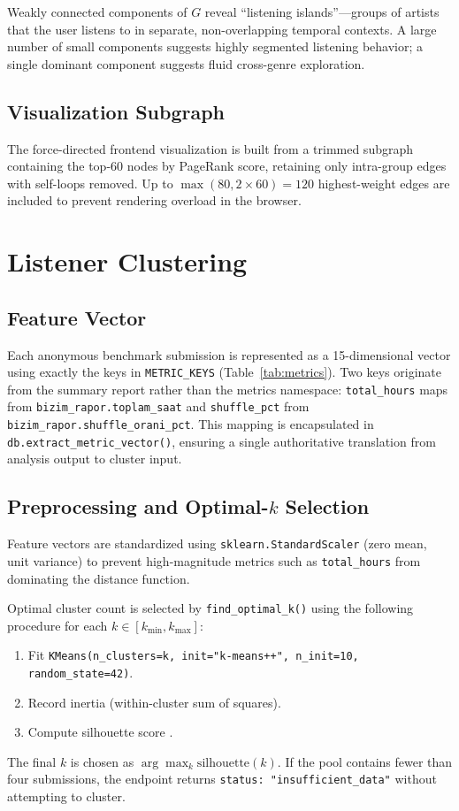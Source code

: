 \documentclass[conference]{IEEEtran}
\begin{document}
Weakly connected components of $G$ reveal ``listening islands''—groups of
artists that the user listens to in separate, non-overlapping temporal
contexts. A large number of small components suggests highly segmented
listening behavior; a single dominant component suggests fluid cross-genre
exploration.

\subsection{Visualization Subgraph}

The force-directed frontend visualization is built from a trimmed subgraph
containing the top-60 nodes by PageRank score, retaining only intra-group
edges with self-loops removed. Up to $\max(80, 2 \times 60) = 120$
highest-weight edges are included to prevent rendering overload in the
browser.

\section{Listener Clustering}

\subsection{Feature Vector}

Each anonymous benchmark submission is represented as a 15-dimensional
vector using exactly the keys in \texttt{METRIC\_KEYS}
(Table~\ref{tab:metrics}). Two keys originate from the summary report rather
than the metrics namespace: \texttt{total\_hours} maps from
\texttt{bizim\_rapor.toplam\_saat} and \texttt{shuffle\_pct} from
\texttt{bizim\_rapor.shuffle\_orani\_pct}. This mapping is encapsulated in
\texttt{db.extract\_metric\_vector()}, ensuring a single authoritative
translation from analysis output to cluster input.

\subsection{Preprocessing and Optimal-$k$ Selection}

Feature vectors are standardized using \texttt{sklearn.StandardScaler}
(zero mean, unit variance) to prevent high-magnitude metrics such as
\texttt{total\_hours} from dominating the distance function.

Optimal cluster count is selected by \texttt{find\_optimal\_k()} using
the following procedure for each $k \in [k_{\min}, k_{\max}]$:
\begin{enumerate}
  \item Fit \texttt{KMeans(n\_clusters=k, init="k-means++", n\_init=10,
        random\_state=42)}.
  \item Record inertia (within-cluster sum of squares).
  \item Compute silhouette score \cite{rousseeuw1987silhouettes}.
\end{enumerate}
The final $k$ is chosen as $\arg\max_k \text{silhouette}(k)$.
If the pool contains fewer than four submissions, the endpoint returns
\texttt{status: "insufficient\_data"} without attempting to cluster.
\end{document}
